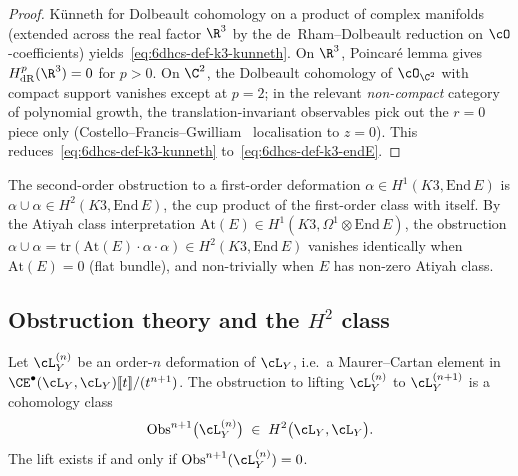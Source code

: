 \begin{proof}
Künneth for Dolbeault cohomology on a product of complex manifolds
(extended across the real factor $\R^3$ by the de~Rham--Dolbeault
reduction on $\cO$-coefficients) yields~\eqref{eq:6dhcs-def-k3-kunneth}.
On $\R^3$, Poincar\'{e} lemma gives
$H^p_{\mathrm{dR}}(\R^3) = 0$ for $p > 0$. On $\C^2$, the Dolbeault
cohomology of $\cO_{\C^2}$ with compact support vanishes except at
$p = 2$; in the relevant \emph{non-compact} category of polynomial
growth, the translation-invariant observables pick out the $r = 0$
piece only (Costello--Francis--Gwilliam~\cite[\S5]{CFG2026}
localisation to $z = 0$). This reduces~\eqref{eq:6dhcs-def-k3-kunneth}
to~\eqref{eq:6dhcs-def-k3-endE}.
\end{proof}

\begin{remark}
\label{rem:6dhcs-atiyah}
The second-order obstruction to a first-order deformation
$\alpha\in H^1(K3,\mathrm{End}\,E)$ is $\alpha\cup\alpha \in
H^2(K3,\mathrm{End}\,E)$, the cup product of the first-order class
with itself. By the Atiyah class interpretation
$\mathrm{At}(E)\in H^1(K3,\Omega^1\otimes\mathrm{End}\,E)$, the
obstruction
$\alpha\cup\alpha = \mathrm{tr}(\mathrm{At}(E)\cdot\alpha\cdot\alpha)
\in H^2(K3,\mathrm{End}\,E)$ vanishes identically when
$\mathrm{At}(E) = 0$ (flat bundle), and non-trivially when $E$ has
non-zero Atiyah class.
\end{remark}

\subsection{Obstruction theory and the $H^2$ class}
\label{subsec:vol2-bvbrst-6dhcs-obs}

\begin{theorem}
\label{thm:6dhcs-obs-sequence}
Let $\cL_Y^{(n)}$ be an order-$n$ deformation of $\cL_Y$, i.e.\ a
Maurer--Cartan element in $\CE^\bullet(\cL_Y,\cL_Y)[\![t]\!]/(t^{n+1})$.
The obstruction to lifting $\cL_Y^{(n)}$ to
$\cL_Y^{(n+1)}$ is a cohomology class
\begin{equation}\label{eq:6dhcs-obs-class}
 \mathrm{Obs}^{n+1}\bigl(\cL_Y^{(n)}\bigr)
 \;\in\;
 H^2\bigl(\cL_Y,\cL_Y\bigr).
\end{equation}
The lift exists if and only if
$\mathrm{Obs}^{n+1}(\cL_Y^{(n)}) = 0$.
\end{theorem}

